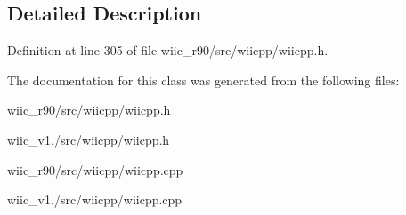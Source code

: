 \subsection{Detailed Description}


Definition at line 305 of file wiic\-\_\-r90/src/wiicpp/wiicpp.\-h.



The documentation for this class was generated from the following files\-:\begin{DoxyCompactItemize}
\item 
wiic\-\_\-r90/src/wiicpp/wiicpp.\-h\item 
wiic\-\_\-v1./src/wiicpp/wiicpp.\-h\item 
wiic\-\_\-r90/src/wiicpp/wiicpp.\-cpp\item 
wiic\-\_\-v1./src/wiicpp/wiicpp.\-cpp\end{DoxyCompactItemize}
